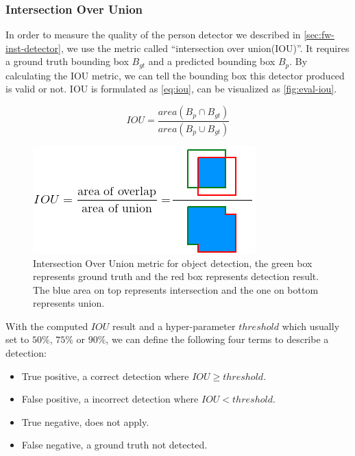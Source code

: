 \subsubsection{Intersection Over Union}
\label{sec:Eval-iou}

In order to measure the quality of the person detector we described in
\autoref{sec:fw-inst-detector}, we use the metric called ``intersection over
union(IOU)''.
It requires a ground truth bounding box $B_{gt}$ and a predicted bounding box
$B_{p}$. By calculating the IOU metric, we can tell the bounding box this
detector produced is valid or not. IOU is formulated as \autoref{eq:iou}, can be
visualized as \autoref{fig:eval-iou}.

\begin{equation}
\label{eq:iou}
\mathit{IOU} = \frac{area(B_p \cap B_{gt})}{area(B_p \cup B_{gt})}
\end{equation}

\begin{figure}
    \begin{center}
        \includegraphics[scale=0.7]{figures/eval_iou.png}
    \end{center}
    \caption[Intersection Over Union metric for object detection]
    {Intersection Over Union metric for object detection,
        the green box represents ground truth and the red box represents
        detection result. The blue area on top represents intersection and
        the one on bottom represents union.}
    \label{fig:eval-iou}
\end{figure}

With the computed $\mathit{IOU}$ result and a hyper-parameter
$\mathit{threshold}$ which usually set to $50\%$, $75\%$ or $90\%$,
we can define the following four terms to describe a detection:

\begin{itemize}
    \item True positive, a correct detection where $\mathit{IOU} \geq
    \mathit{threshold}$.
    \item False positive, a incorrect detection where $\mathit{IOU} <
    \mathit{threshold}$.
    \item True negative, does not apply.
    \item False negative, a ground truth not detected.
\end{itemize}

